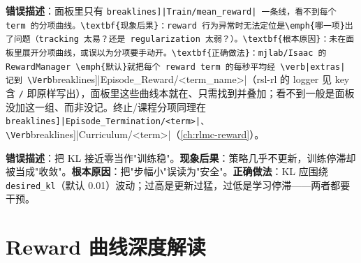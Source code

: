 \begin{pitfall}
\textbf{错误描述}：面板里只有 \Verb[breaklines]|Train/mean_reward| 一条线，看不到每个 term 的分项曲线。\textbf{现象后果}：reward 行为异常时无法定位是\emph{哪一项}出了问题（tracking 太易？还是 regularization 太弱？）。\textbf{根本原因}：未在面板里展开分项曲线，或误以为分项要手动开。\textbf{正确做法}：mjlab/Isaac 的 RewardManager \emph{默认}就把每个 reward term 的每秒平均经 \verb|extras| 记到 \Verb[breaklines]|Episode_Reward/<term_name>|（rsl-rl 的 logger 见 key 含 \texttt{/} 即原样写出），面板里这些曲线本就在、只需找到并叠加；看不到一般是面板没加这一组、而非没记。终止/课程分项同理在 \Verb[breaklines]|Episode_Termination/<term>|、\Verb[breaklines]|Curriculum/<term>|（\cref{ch:rlmc-reward}）。
\end{pitfall}

\begin{pitfall}
\textbf{错误描述}：把 KL 接近零当作"训练稳"。\textbf{现象后果}：策略几乎不更新，训练停滞却被当成"收敛"。\textbf{根本原因}：把"步幅小"误读为"安全"。\textbf{正确做法}：KL 应围绕 \verb|desired_kl|（默认 0.01）波动；过高是更新过猛，过低是学习停滞——两者都要干预。
\end{pitfall}

\begin{practice}[本节动手任务]
\end{practice}

\section{Reward 曲线深度解读}
\label{sec:rlmc-diag-reward}

